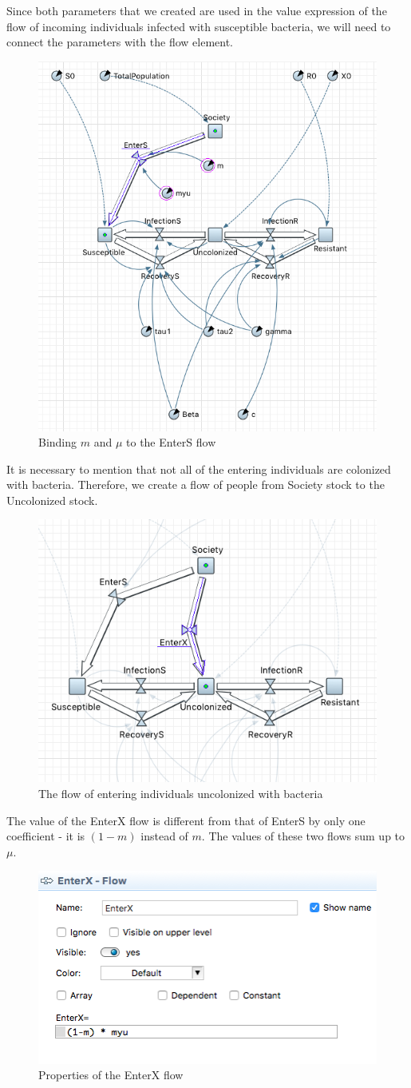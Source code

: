 Since both parameters that we created are used in the value expression of the flow of incoming individuals infected with susceptible bacteria, we will need to connect the parameters with the flow element.

\begin{figure}[H]
  \centering
  \includegraphics[height=0.6\textwidth]{img/screens/society/society8}
  \caption{Binding $m$ and $\mu$ to the EnterS flow}
\end{figure}

It is necessary to mention that not all of the entering individuals are colonized with bacteria. Therefore, we create a flow of people from Society stock to the Uncolonized stock.

\begin{figure}[H]
  \centering
  \includegraphics[height=0.4\textwidth]{img/screens/society/society9}
  \caption{The flow of entering individuals uncolonized with bacteria}
\end{figure}

The value of the EnterX flow is different from that of EnterS by only one coefficient - it is $(1 - m)$ instead of $m$. The values of these two flows sum up to $\mu$.

\begin{figure}[H]
  \centering
  \includegraphics[height=0.3\textwidth]{img/screens/society/society17}
  \caption{Properties of the EnterX flow}
\end{figure}

